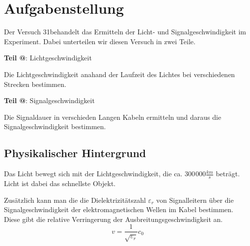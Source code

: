\documentclass[10pt,a4paper]{article}
\makeatletter
\newcommand*{\rom}[1]{\expandafter\@slowromancap\romannumeral #1@}
\newcommand{\vnr}{31}
\makeatother
\begin{document}
\newpage

\tableofcontents

\vspace{10pt}


\section{Aufgabenstellung}
\begin{flushleft}
Der Versuch \vnr behandelt das Ermitteln der Licht- und Signalgeschwindigkeit im Experiment. Dabei unterteilen wir diesen Versuch in zwei Teile.

\textbf{Teil \rom{1}}: Lichtgeschwindigkeit

Die Lichtgeschwindigkeit anahand der Laufzeit des Lichtes bei verschiedenen Strecken bestimmen.
\end{flushleft}
\begin{flushleft}
\textbf{Teil \rom{2}}: Signalgeschwindigkeit

Die Signaldauer in verschieden Langen Kabeln ermitteln und daraus die Signalgeschwindigkeit bestimmen.
\end{flushleft}

\subsection{Physikalischer Hintergrund}
\begin{flushleft}
Das Licht bewegt sich mit der Lichtgeschwindigkeit, die ca. $300\hspace{1pt}000 \frac{km}{s}$ beträgt. Licht ist dabei das schnellste \glqq Objekt\grqq.

Zusätzlich kann man die die Dielektrizitätszahl $\varepsilon_r$ von Signalleitern über die Signalgeschwindigkeit der elektromagnetischen Wellen im Kabel bestimmen. Diese gibt die relative Verringerung der Ausbreitungsgeschwindigkeit an.
\begin{equation}\label{eq:diel}
v = \frac{1}{\sqrt{\varepsilon_r}} c_0
\end{equation}
\end{flushleft}
\end{document}
